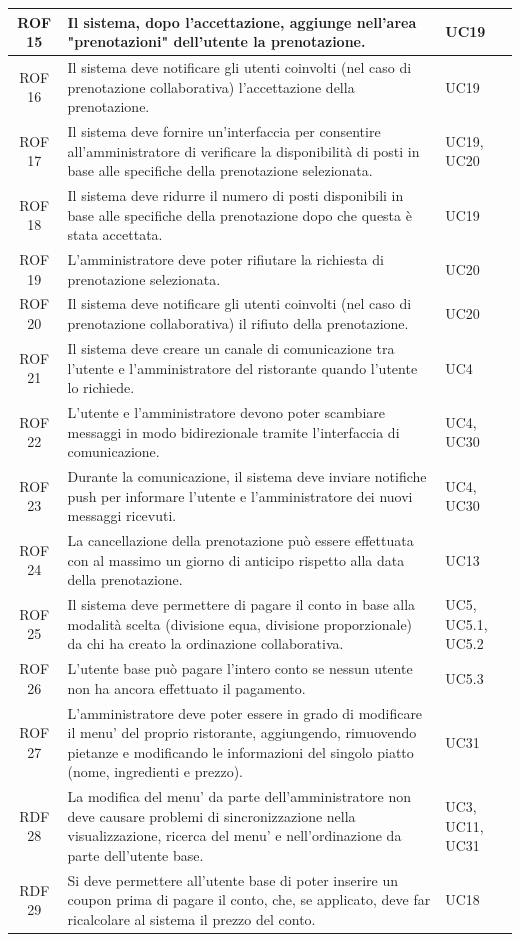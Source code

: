 \documentclass[12pt, oneside]{article}
\begin{document}
\begin{longtable}{|c|p{14cm}|p{2cm}|}
    \hline
    ROF 15& Il sistema, dopo l'accettazione, aggiunge nell'area "prenotazioni" dell'utente la prenotazione. & UC19 \\
    \hline
    ROF 16& Il sistema deve notificare gli utenti coinvolti (nel caso di prenotazione collaborativa) l'accettazione della prenotazione. & UC19 \\
    \hline
    ROF 17& Il sistema deve fornire un'interfaccia per consentire all'amministratore di verificare la disponibilità di posti in base alle specifiche della prenotazione selezionata. & UC19, UC20 \\
    \hline
    ROF 18& Il sistema deve ridurre il numero di posti disponibili in base alle specifiche della prenotazione dopo che questa è stata accettata. & UC19 \\
    \hline
    ROF 19& L'amministratore deve poter rifiutare la richiesta di prenotazione selezionata. & UC20 \\
    \hline
    ROF 20& Il sistema deve notificare gli utenti coinvolti (nel caso di prenotazione collaborativa) il rifiuto della prenotazione. & UC20 \\
    \hline
    ROF 21& Il sistema deve creare un canale di comunicazione tra l'utente e l'amministratore del ristorante quando l'utente lo richiede. & UC4 \\
    \hline
    ROF 22& L'utente e l'amministratore devono poter scambiare messaggi in modo bidirezionale tramite l'interfaccia di comunicazione. & UC4, UC30 \\
    \hline
    ROF 23& Durante la comunicazione, il sistema deve inviare notifiche push per informare l'utente e l'amministratore dei nuovi messaggi ricevuti. & UC4, UC30 \\
    \hline
    ROF 24&  La cancellazione della prenotazione può essere effettuata con al massimo un giorno di anticipo rispetto alla data della prenotazione.  & UC13 \\ 
    \hline
    ROF 25& Il sistema deve permettere di pagare il conto in base alla modalità scelta (divisione equa, divisione proporzionale) da chi ha creato la ordinazione collaborativa. & UC5, UC5.1, UC5.2 \\
    \hline
    ROF 26& L'utente base può pagare l'intero conto se nessun utente non ha ancora effettuato il pagamento. & UC5.3 \\
    \hline
    ROF 27& L'amministratore deve poter essere in grado di modificare il menu' del proprio ristorante, aggiungendo, rimuovendo pietanze e modificando le informazioni del singolo piatto (nome, ingredienti e prezzo). & UC31 \\
    \hline
    RDF 28& La modifica del menu' da parte dell'amministratore non deve causare problemi di sincronizzazione nella visualizzazione, ricerca del menu' e nell'ordinazione da parte dell'utente base. &  UC3, UC11, UC31 \\
    \hline
    RDF 29& Si deve permettere all'utente base di poter inserire un coupon prima di pagare il conto, che, se applicato, deve far ricalcolare al sistema il prezzo del conto. & UC18 \\
    \hline


\end{longtable}
\end{document}
